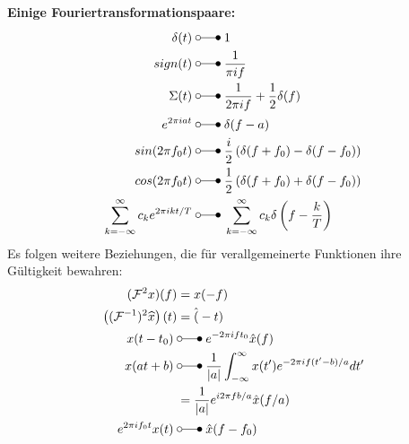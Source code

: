 \textbf{Einige Fouriertransformationspaare:}
\begin{align*}
    \delta(t) \;                                 & \laplace\; 1                                                        \\
    sign(t) \;                                   & \laplace\; \frac{1}{\pi if}                                         \\
    \Sigma(t) \;                                 & \laplace\; \frac{1}{2\pi if}+\frac{1}{2}\delta(f)                   \\
    e^{2\pi iat} \;                              & \laplace\; \delta(f-a)                                              \\
    sin(2\pi f_0t) \;                            & \laplace\; \frac{i}{2}\left(\delta(f+f_0)-\delta(f-f_0)\right)      \\
    cos(2\pi f_0t) \;                            & \laplace\; \frac{1}{2}\left(\delta(f+f_0)+\delta(f-f_0)\right)      \\
    \sum_{k=-\infty}^\infty c_ke^{2\pi ikt/T} \; & \laplace\; \sum_{k=-\infty}^\infty c_k\delta\left(f-\frac kT\right)
\end{align*}
Es folgen weitere Beziehungen, die für verallgemeinerte Funktionen ihre Gültigkeit bewahren:
\begin{align*}
    (\mathcal{F}^2x)(f)                             & = x(-f)                                                                     \\
    \left((\mathcal{F}^{-1})^2\widehat{x}\right)(t) & = \hat(-t)                                                                  \\
    x(t-t_{0}) \;                                   & \laplace\; e^{-2\pi ift_0}\hat{x}(f)                                        \\
    x(at+b) \;                                      & \laplace\; \frac{1}{|a|}\int_{-\infty}^{\infty}x(t')e^{-2\pi if(t'-b)/a}dt' \\
                                                    & =\frac1{|a|}e^{i2\pi fb/a}\hat{x}(f/a)                                      \\
    e^{2\pi if_{0}t}x(t) \;                         & \laplace\; \hat{x}(f-f_0)
\end{align*}

